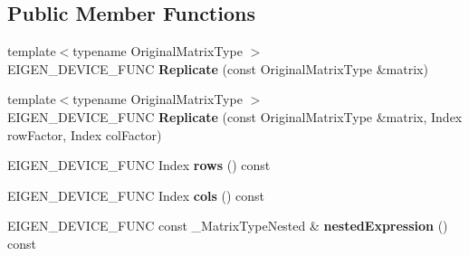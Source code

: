 \subsection*{Public Member Functions}
\begin{DoxyCompactItemize}
\item 
\mbox{\label{class_eigen_1_1_replicate_a66e289ca86915a631cb1ca4125f64db0}} 
{\footnotesize template$<$typename Original\+Matrix\+Type $>$ }\\E\+I\+G\+E\+N\+\_\+\+D\+E\+V\+I\+C\+E\+\_\+\+F\+U\+NC {\bfseries Replicate} (const Original\+Matrix\+Type \&matrix)
\item 
\mbox{\label{class_eigen_1_1_replicate_acfdb96424b779cea2b8b43423d4574b4}} 
{\footnotesize template$<$typename Original\+Matrix\+Type $>$ }\\E\+I\+G\+E\+N\+\_\+\+D\+E\+V\+I\+C\+E\+\_\+\+F\+U\+NC {\bfseries Replicate} (const Original\+Matrix\+Type \&matrix, Index row\+Factor, Index col\+Factor)
\item 
\mbox{\label{class_eigen_1_1_replicate_ad49008b1890464697326d138f5e69a2e}} 
E\+I\+G\+E\+N\+\_\+\+D\+E\+V\+I\+C\+E\+\_\+\+F\+U\+NC Index {\bfseries rows} () const
\item 
\mbox{\label{class_eigen_1_1_replicate_affbc470e2987519cc4357a222c6180fa}} 
E\+I\+G\+E\+N\+\_\+\+D\+E\+V\+I\+C\+E\+\_\+\+F\+U\+NC Index {\bfseries cols} () const
\item 
\mbox{\label{class_eigen_1_1_replicate_a3b35592e6f841af1bbf13012b25da352}} 
E\+I\+G\+E\+N\+\_\+\+D\+E\+V\+I\+C\+E\+\_\+\+F\+U\+NC const \+\_\+\+Matrix\+Type\+Nested \& {\bfseries nested\+Expression} () const
\end{DoxyCompactItemize}
